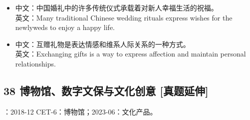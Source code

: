 \documentclass[a4paper,11pt,UTF8,fontset=none]{ctexart}
\begin{document}
\par

\begin{itemize}[leftmargin=1.7em,itemsep=1pt,parsep=0pt,topsep=2pt]
\item \noindent 中文：中国婚礼中的许多传统仪式承载着对新人幸福生活的祝福。\\ 英文：Many traditional Chinese wedding rituals express wishes for the newlyweds to enjoy a happy life.\par


\item \noindent 中文：互赠礼物是表达情感和维系人际关系的一种方式。\\ 英文：Exchanging gifts is a way to express affection and maintain personal relationships.\par


\end{itemize}

\subsection{38 博物馆、数字文保与文化创意 {\color{AccentBlue} [真题延伸]}}

\begin{tcolorbox}[enhanced,breakable,boxrule=0.35pt,colback=VeryPaleBlue,colframe=AccentBlue!40,left=7pt,right=7pt,top=4pt,bottom=4pt,borderline west={2pt}{0pt}{AccentBlue},before skip=4pt,after skip=6pt]
：2018-12 CET-6：博物馆；2023-06：文化产品。\par


\end{tcolorbox}
\end{document}
